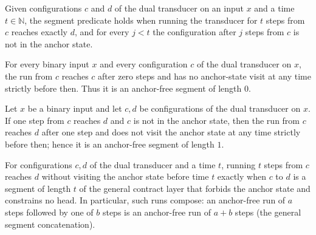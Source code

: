 \begin{definition}
\label{Complexity.tautDualSegment}
\leanok
{}
Given configurations $c$ and $d$ of the dual transducer on an input $x$ and a time
$t \in \mathbb{N}$, the segment predicate holds when running the transducer for $t$
steps from $c$ reaches exactly $d$, and for every $j < t$ the configuration after $j$
steps from $c$ is not in the anchor state.
\end{definition}

\begin{lemma}
\label{Complexity.tautDual_segment_zero}
\leanok
{}
For every binary input $x$ and every configuration $c$ of the dual transducer on $x$,
the run from $c$ reaches $c$ after zero steps and has no anchor-state visit at any time
strictly before then. Thus it is an anchor-free segment of length $0$.
\end{lemma}

\begin{lemma}
\label{Complexity.tautDual_segment_one}
\leanok
{}
Let $x$ be a binary input and let $c,d$ be configurations of the dual transducer on $x$.
If one step from $c$ reaches $d$ and $c$ is not in the anchor state, then the run from
$c$ reaches $d$ after one step and does not visit the anchor state at any time strictly
before then; hence it is an anchor-free segment of length $1$.
\end{lemma}

\begin{lemma}
\label{Complexity.tautDualSegment_iff_segment}
\leanok
{}
For configurations $c, d$ of the dual transducer and a time $t$, running $t$ steps from
$c$ reaches $d$ without visiting the anchor state before time $t$ exactly when $c$ to $d$
is a segment of length $t$ of the general contract layer that forbids the anchor state and
constrains no head. In particular, such runs compose: an anchor-free run of $a$ steps
followed by one of $b$ steps is an anchor-free run of $a + b$ steps (the general segment
concatenation).
\end{lemma}

